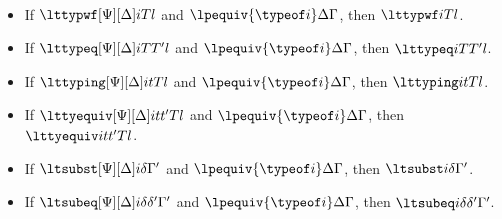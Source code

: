 \begin{lemma}$ $
  \begin{itemize}
  \item If $\lttypwf[\Psi][\Delta]i T l$ and $\lpequiv{\typeof i}\Delta\Gamma$, then
    $\lttypwf i{T} l$.
  \item If $\lttypeq[\Psi][\Delta]i T{T'} l$ and $\lpequiv{\typeof i}\Delta\Gamma$, then
    $\lttypeq i{T}{T'} l$.
  \item If $\lttyping[\Psi][\Delta]i t T l$ and $\lpequiv{\typeof i}\Delta\Gamma$, then
    $\lttyping i{t}{T} l$.
  \item If $\lttyequiv[\Psi][\Delta]i t{t'} T l$ and $\lpequiv{\typeof i}\Delta\Gamma$, then
    $\lttyequiv i{t}{t'}{T} l$.
  \item If $\ltsubst[\Psi][\Delta] i{\delta}{\Gamma'}$ and $\lpequiv{\typeof i}\Delta\Gamma$, then
    $\ltsubst i{\delta}{\Gamma'}$.
  \item If $\ltsubeq[\Psi][\Delta] i{\delta}{\delta'}{\Gamma'}$ and $\lpequiv{\typeof i}\Delta\Gamma$, then
    $\ltsubeq i{\delta}{\delta'}{\Gamma'}$.
  \end{itemize}
\end{lemma}
